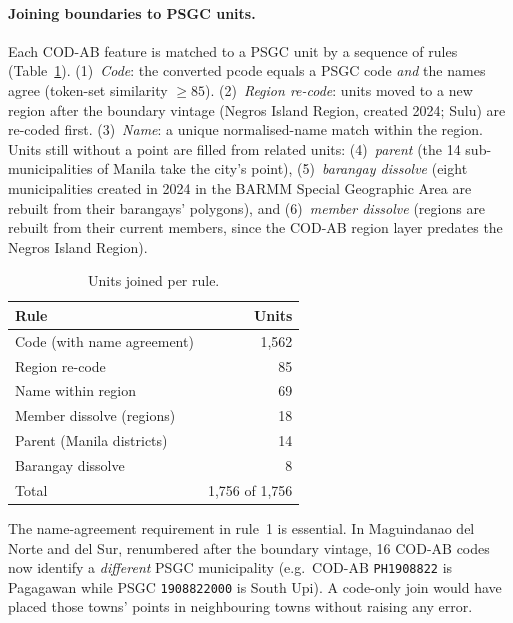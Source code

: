\documentclass[acmtog]{acmart}
\begin{document}
\paragraph{Joining boundaries to PSGC units.} Each COD-AB feature is matched to a PSGC unit by a
sequence of rules (Table~\ref{tab:join}). (1)~\emph{Code}: the converted pcode equals a PSGC code
\emph{and} the names agree (token-set similarity $\geq 85$). (2)~\emph{Region re-code}: units
moved to a new region after the boundary vintage (Negros Island Region, created 2024; Sulu) are
re-coded first. (3)~\emph{Name}: a unique normalised-name match within the region. Units still
without a point are filled from related units: (4)~\emph{parent} (the 14 sub-municipalities of
Manila take the city's point), (5)~\emph{barangay dissolve} (eight municipalities created in 2024
in the BARMM Special Geographic Area are rebuilt from their barangays' polygons), and
(6)~\emph{member dissolve} (regions are rebuilt from their current members, since the COD-AB
region layer predates the Negros Island Region).

\begin{table}[t]
  \caption{Units joined per rule.}
  \label{tab:join}
  \small
  \begin{tabular}{lr}
    \toprule
    Rule & Units \\
    \midrule
    Code (with name agreement) & 1,562 \\
    Region re-code & 85 \\
    Name within region & 69 \\
    Member dissolve (regions) & 18 \\
    Parent (Manila districts) & 14 \\
    Barangay dissolve & 8 \\
    \midrule
    Total & 1,756 of 1,756 \\
    \bottomrule
  \end{tabular}
\end{table}

The name-agreement requirement in rule~1 is essential. In Maguindanao del Norte and del Sur,
renumbered after the boundary vintage, 16 COD-AB codes now identify a \emph{different} PSGC
municipality (e.g.\ COD-AB \texttt{PH1908822} is Pagagawan while PSGC \texttt{1908822000} is
South Upi). A code-only join would have placed those towns' points in neighbouring towns without
raising any error.
\end{document}
